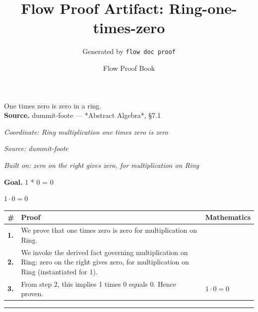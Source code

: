 \documentclass[11pt]{article}
\title{Flow Proof Artifact: Ring-one-times-zero}
\author{Generated by \texttt{flow doc proof}}
\date{Flow Proof Book}
\theoremstyle{definition}
\begin{document}
\maketitle
One times zero is zero in a ring.\\[0.5em]
\textbf{Source.} dummit-foote — *Abstract Algebra*, §7.1\\[0.5em]
\bigskip
{}\par
\smallskip\noindent\textit{Coordinate: Ring \cdot multiplication \cdot one times zero is zero}\par
\smallskip\noindent\textit{Source: dummit-foote}\par
\smallskip\noindent\textit{Built on: zero on the right gives zero, for multiplication on Ring}\par
\medskip
\noindent\textbf{Goal.} 1 * 0 = 0\par
\noindent$\displaystyle 1 \cdot 0 = 0$\par
\medskip
\noindent
\begin{tabular}{@{} >{\raggedright\arraybackslash}p{} >{\raggedright\arraybackslash}p{} >{\raggedleft\arraybackslash}p{} @{}}
\textbf{\#} & \textbf{Proof} & \textbf{Mathematics} \\
\midrule
\textbf{1.} & We prove that one times zero is zero for multiplication on Ring. & \\[0.45em]
\textbf{2.} & We invoke the derived fact governing multiplication on Ring: zero on the right gives zero, for multiplication on Ring (instantiated for 1). & \\[0.45em]
\textbf{3.} & From step 2, this implies 1 times 0 equals 0. Hence proven. & $\displaystyle 1 \cdot 0 = 0$ \\[0.45em]
\bottomrule
\end{tabular}
\label{thm:Ring-multiplication-one_times_zero_is_zero}
\par\medskip\hrule
\end{document}
